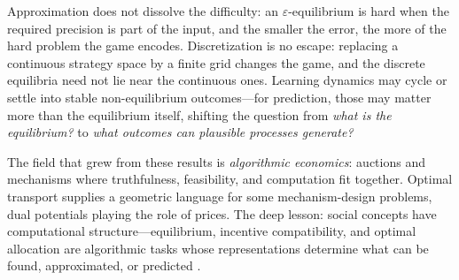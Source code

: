Approximation does not dissolve the difficulty: an $\varepsilon$-equilibrium is hard when the required precision is part of the input, and the smaller the error, the more of the hard problem the game encodes. Discretization is no escape: replacing a continuous strategy space by a finite grid changes the game, and the discrete equilibria need not lie near the continuous ones. Learning dynamics may cycle or settle into stable non-equilibrium outcomes---for prediction, those may matter more than the equilibrium itself, shifting the question from \emph{what is the equilibrium?} to \emph{what outcomes can plausible processes generate?}

The field that grew from these results is \emph{algorithmic economics}: auctions and mechanisms where truthfulness, feasibility, and computation fit together. Optimal transport supplies a geometric language for some mechanism-design problems, dual potentials playing the role of prices. The deep lesson: social concepts have computational structure---equilibrium, incentive compatibility, and optimal allocation are algorithmic tasks whose representations determine what can be found, approximated, or predicted \cite{daskalakis-nash,daskalakis-markets}.

